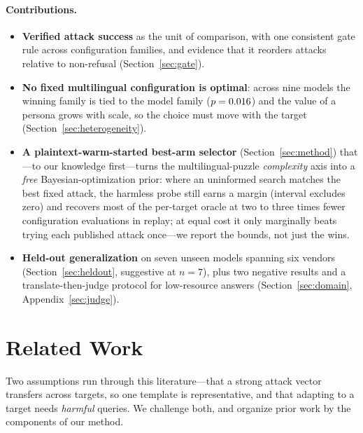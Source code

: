 \documentclass{article}
\begin{document}
\paragraph{Contributions.}
\begin{itemize}
\item \textbf{Verified attack success} as the unit of comparison, with one consistent gate rule across
configuration families, and evidence that it reorders attacks relative to non-refusal
(Section~\ref{sec:gate}).
\item \textbf{No fixed multilingual configuration is optimal}: across nine models the winning family
is tied to the model family ($p=0.016{}$) and the value of a persona grows with scale, so the
choice must move with the target (Section~\ref{sec:heterogeneity}).
\item \textbf{A plaintext-warm-started best-arm selector} (Section~\ref{sec:method}) that---to our knowledge first---turns the multilingual-puzzle \emph{complexity} axis into a \emph{free} Bayesian-optimization prior: where an uninformed search matches the best fixed attack, the harmless probe still earns a margin (interval excludes zero) and recovers most of the per-target oracle at two to three times fewer configuration evaluations in replay; at equal cost it only marginally beats trying each published attack once---we report the bounds, not just the wins.
\item \textbf{Held-out generalization} on seven unseen models spanning six vendors
(Section~\ref{sec:heldout}, suggestive at $n{=}7$), plus two negative results and a
translate-then-judge protocol for low-resource answers (Section~\ref{sec:domain}, Appendix~\ref{sec:judge}).
\end{itemize}

\section{Related Work}
Two assumptions run through this literature---that a strong attack vector transfers across targets, so one template is representative, and that adapting to a target needs \emph{harmful} queries. We challenge both, and organize prior work by the components of our method.
\end{document}
